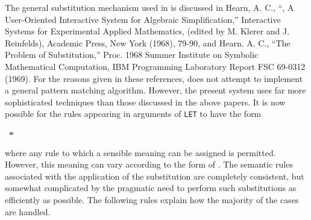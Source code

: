 The general substitution mechanism used in {\REDUCE} is discussed in Hearn, A.
C., ``{\REDUCE}, A User-Oriented Interactive System for Algebraic
Simplification,'' Interactive Systems for Experimental Applied Mathematics,
(edited by M. Klerer and J. Reinfelds), Academic Press, New York (1968),
79-90, and Hearn. A. C., ``The Problem of Substitution,'' Proc. 1968 Summer
Institute on Symbolic Mathematical Computation, IBM Programming Laboratory
Report FSC 69-0312 (1969). For the reasons given in these
references, {\REDUCE} does not attempt to implement a general pattern
matching algorithm.  However, the present system uses far more sophisticated
techniques than those discussed in the above papers.  It is now possible for
the rules appearing in arguments of \texttt{LET} to have the form
\begin{syntax}
  \texttt{ = }
\end{syntax}
where any rule to which a sensible meaning can be assigned is permitted.
However, this meaning can vary according to the form of . The semantic rules associated with the application of the
substitution are completely consistent, but somewhat complicated by the
pragmatic need to perform such substitutions as efficiently as possible.
The following rules explain how the majority of the cases are handled.

